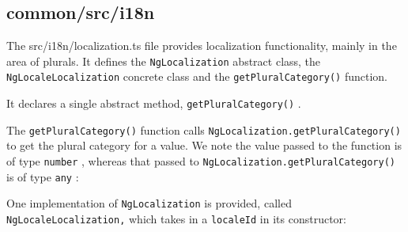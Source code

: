 \subsection{common/src/i18n}

The src/i18n/localization.ts file provides localization functionality, mainly in the area of
plurals. It defines the
\texttt{NgLocalization}
abstract class, the
\texttt{NgLocaleLocalization}
concrete class and the
\texttt{getPluralCategory()}
function.



It declares a single abstract method,
\texttt{getPluralCategory()}
.

The
\texttt{getPluralCategory()}
function calls
\texttt{NgLocalization.getPluralCategory()}
to
get the plural category for a value. We note the value passed to the function is of type
\texttt{number}
, whereas that passed to
\texttt{NgLocalization.getPluralCategory()}
is of type
\texttt{any}
:



One implementation of
\texttt{NgLocalization}
is provided, called
\texttt{NgLocaleLocalization,}
which takes in a
\texttt{localeId}
in its constructor:


